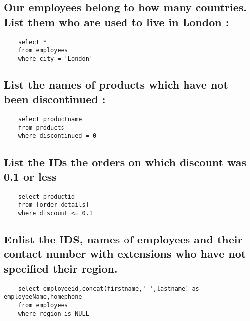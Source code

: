\documentclass{article}
\begin{document}
\subsection{Our employees belong to how many countries. List them who are used to live in London :}
\begin{lstlisting}
    select * 
    from employees
    where city = 'London'
\end{lstlisting}

\subsection{List the names of products which have not been discontinued :}
\begin{lstlisting}
    select productname 
    from products
    where discontinued = 0
\end{lstlisting}

\subsection{List the IDs the orders on which discount was 0.1 or less}
\begin{lstlisting}
    select productid
    from [order details]
    where discount <= 0.1
\end{lstlisting}

\subsection{Enlist the IDS, names of employees and their contact number with extensions who have not specified their 
region. }
\begin{lstlisting}
    select employeeid,concat(firstname,' ',lastname) as employeeName,homephone
    from employees
    where region is NULL
\end{lstlisting}
\end{document}
